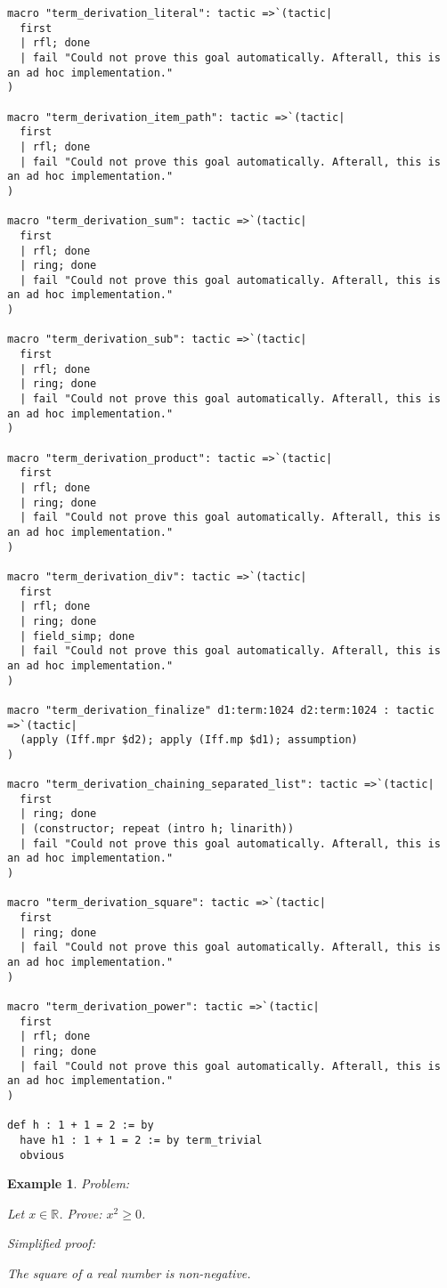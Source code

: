 \documentclass{article}
\newtheorem{example}{Example}
\begin{document}
\begin{tcolorbox}[colback=white!10, width=\linewidth]
\begin{lstlisting}[language=Lean4]
macro "term_derivation_literal": tactic =>`(tactic|
  first
  | rfl; done
  | fail "Could not prove this goal automatically. Afterall, this is an ad hoc implementation."
)

macro "term_derivation_item_path": tactic =>`(tactic|
  first
  | rfl; done
  | fail "Could not prove this goal automatically. Afterall, this is an ad hoc implementation."
)

macro "term_derivation_sum": tactic =>`(tactic|
  first
  | rfl; done
  | ring; done
  | fail "Could not prove this goal automatically. Afterall, this is an ad hoc implementation."
)

macro "term_derivation_sub": tactic =>`(tactic|
  first
  | rfl; done
  | ring; done
  | fail "Could not prove this goal automatically. Afterall, this is an ad hoc implementation."
)

macro "term_derivation_product": tactic =>`(tactic|
  first
  | rfl; done
  | ring; done
  | fail "Could not prove this goal automatically. Afterall, this is an ad hoc implementation."
)

macro "term_derivation_div": tactic =>`(tactic|
  first
  | rfl; done
  | ring; done
  | field_simp; done
  | fail "Could not prove this goal automatically. Afterall, this is an ad hoc implementation."
)

macro "term_derivation_finalize" d1:term:1024 d2:term:1024 : tactic =>`(tactic|
  (apply (Iff.mpr $d2); apply (Iff.mp $d1); assumption)
)

macro "term_derivation_chaining_separated_list": tactic =>`(tactic|
  first
  | ring; done
  | (constructor; repeat (intro h; linarith))
  | fail "Could not prove this goal automatically. Afterall, this is an ad hoc implementation."
)

macro "term_derivation_square": tactic =>`(tactic|
  first
  | ring; done
  | fail "Could not prove this goal automatically. Afterall, this is an ad hoc implementation."
)

macro "term_derivation_power": tactic =>`(tactic|
  first
  | rfl; done
  | ring; done
  | fail "Could not prove this goal automatically. Afterall, this is an ad hoc implementation."
)

def h : 1 + 1 = 2 := by
  have h1 : 1 + 1 = 2 := by term_trivial
  obvious

\end{lstlisting}
\end{tcolorbox}


\begin{example}
Problem:
\begin{tcolorbox}[colback=yellow!10, width=\linewidth]
Let $x\in\mathbb{R}$. Prove: $x^2\ge 0$.
\end{tcolorbox}

Simplified proof:
\begin{tcolorbox}[colback=blue!10, width=\linewidth]
The square of a real number is non-negative.
\end{tcolorbox}
\end{example}
\end{document}
